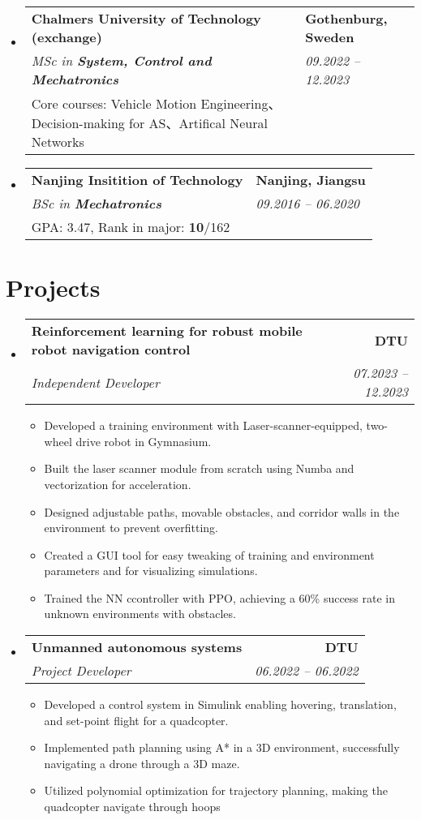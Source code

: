 \documentclass[letterpaper,11pt]{article}
\makeatletter
\newcommand{\resumeItem}[1]{
  \item\small{
    {#1 \vspace{-2pt}}
  }
}
\newcommand{\resumeSubheading}[4]{
  \vspace{-2pt}\item\small{
    \begin{tabular*}{0.97\textwidth}[t]{l@{\extracolsep{\fill}}r}
      \textbf{#1} & \textbf{#2} \\
      \textit{#3} & \textit{#4} \\
    \end{tabular*}\vspace{-7pt}
  }
}
\newcommand{\resumeSubheadingExtended}[5]{  
  \item\small{
    \begin{tabular*}{0.97\textwidth}{@{}p{0.8\textwidth}p{0.52\textwidth}@{}}
      \textbf{#1} & \textbf{#2} \\  %
      \textit{#3} & \textit{#4} \\  %
      #5 &  %
    \end{tabular*}\vspace{-10pt}
  }
}
\newcommand{\resumeSubHeadingListStart}{\begin{itemize}[leftmargin=0.15in, label={}]}
\newcommand{\resumeSubHeadingListEnd}{\end{itemize}}
\newcommand{\resumeItemListStart}{\begin{itemize}}
\newcommand{\resumeItemListEnd}{\end{itemize}\vspace{-5pt}}
\makeatother
\begin{document}
  \vspace{0.5mm} %

  \resumeSubHeadingListStart
    \resumeSubheadingExtended
      {Chalmers University of Technology (exchange)}{Gothenburg, Sweden}
      {MSc in \textbf{System, Control and Mechatronics}}{09.2022 -- 12.2023}
      {Core courses: Vehicle Motion Engineering、Decision-making for AS、Artifical Neural Networks}
  \resumeSubHeadingListEnd
  
  \vspace{0.5mm} %

  \resumeSubHeadingListStart
    \resumeSubheadingExtended
      {Nanjing Insitition of Technology}{Nanjing, Jiangsu}
      {BSc in \textbf{Mechatronics}}{09.2016 -- 06.2020}
      {GPA: 3.47, Rank in major: \textbf{10}/162}
  \resumeSubHeadingListEnd

\section{Projects}
  \resumeSubHeadingListStart

    \resumeSubheading
      {\textbf{Reinforcement learning for robust
      mobile robot navigation control \; \href{https://1drv.ms/v/s!Al-YZOpjHxorgslaTIu4oeTj8TYROw?e=EflSJj}{\faVideoCamera} \;  \href{https://github.com/SpartanTan/RLATR}{\faGithub}}}{DTU}
      {Independent Developer}{07.2023 -- 12.2023}
      \resumeItemListStart
        \resumeItem{Developed a training environment with  Laser-scanner-equipped, two-wheel drive robot in Gymnasium.} 
        \resumeItem{Built the laser scanner module from scratch using Numba and vectorization for acceleration.} 
        \resumeItem{Designed adjustable paths, movable obstacles, and corridor walls in the environment to prevent overfitting.} 
        \resumeItem{Created a GUI tool for easy tweaking of training and environment parameters and for visualizing simulations.} \resumeItem{Trained the NN ccontroller with PPO, achieving a 60\% success rate in unknown environments with obstacles.}
      \resumeItemListEnd
      
    \resumeSubheading
      {\textbf{Unmanned autonomous systems \; \href{https://1drv.ms/v/s!Al-YZOpjHxorgslZm5SJR7mVF_eoPw?e=4kRkvd}{\faVideoCamera} \;  \href{https://github.com/SpartanTan/31390-UAS-2022}{\faGithub}}}{DTU}
      {Project Developer}{06.2022 -- 06.2022}
      \resumeItemListStart
      \resumeItem{Developed a control system in Simulink enabling hovering, translation, and set-point flight for a quadcopter.} 
      \resumeItem{Implemented path planning using A* in a 3D environment, successfully navigating a drone through a 3D maze.} 
      \resumeItem{Utilized polynomial optimization for trajectory planning, making the quadcopter navigate through hoops}
      \resumeItemListEnd
  \resumeSubHeadingListEnd
\end{document}
